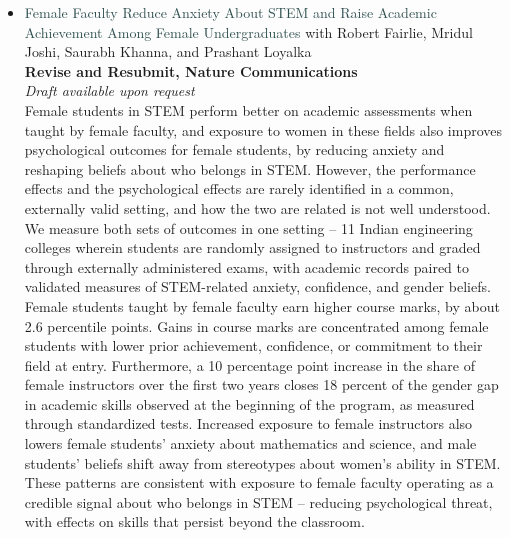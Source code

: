 \documentclass[letter,10pt]{article}
\begin{document}
\begin{itemize}
    \item[] \textcolor{darkslategray}{Female Faculty Reduce Anxiety About STEM and Raise Academic Achievement Among Female Undergraduates} {\small{with Robert Fairlie, Mridul Joshi, Saurabh Khanna, and Prashant Loyalka}}\\
    {\small{\textbf{Revise and Resubmit, Nature Communications}}}\\
    {\small{\textit{Draft available upon request}}}\\
    Female students in STEM perform better on academic assessments when taught by female faculty, and exposure to women in these fields also improves psychological outcomes for female students, by reducing anxiety and reshaping beliefs about who belongs in STEM. However, the performance effects and the psychological effects are rarely identified in a common, externally valid setting, and how the two are related is not well understood. We measure both sets of outcomes in one setting -- 11 Indian engineering colleges wherein students are randomly assigned to instructors and graded through externally administered exams, with academic records paired to validated measures of STEM-related anxiety, confidence, and gender beliefs. Female students taught by female faculty earn higher course marks, by about 2.6 percentile points. Gains in course marks are concentrated among female students with lower prior achievement, confidence, or commitment to their field at entry. Furthermore, a 10 percentage point increase in the share of female instructors over the first two years closes 18 percent of the gender gap in academic skills observed at the beginning of the program, as measured through standardized tests. Increased exposure to female instructors also lowers female students’ anxiety about mathematics and science, and male students' beliefs shift away from stereotypes about women's ability in STEM. These patterns are consistent with exposure to female faculty operating as a credible signal about who belongs in STEM -- reducing psychological threat, with effects on skills that persist beyond the classroom.


\end{itemize}
\end{document}
